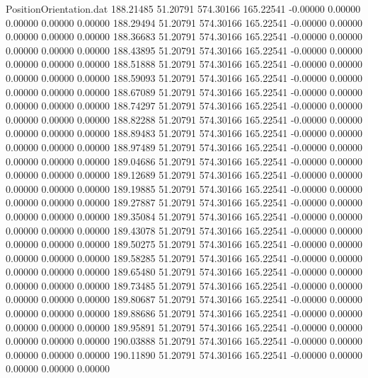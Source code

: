 \begin{filecontents}{PositionOrientation.dat}
 188.21485   51.20791  574.30166   165.22541   -0.00000    0.00000    0.00000    0.00000    0.00000
 188.29494   51.20791  574.30166   165.22541   -0.00000    0.00000    0.00000    0.00000    0.00000
 188.36683   51.20791  574.30166   165.22541   -0.00000    0.00000    0.00000    0.00000    0.00000
 188.43895   51.20791  574.30166   165.22541   -0.00000    0.00000    0.00000    0.00000    0.00000
 188.51888   51.20791  574.30166   165.22541   -0.00000    0.00000    0.00000    0.00000    0.00000
 188.59093   51.20791  574.30166   165.22541   -0.00000    0.00000    0.00000    0.00000    0.00000
 188.67089   51.20791  574.30166   165.22541   -0.00000    0.00000    0.00000    0.00000    0.00000
 188.74297   51.20791  574.30166   165.22541   -0.00000    0.00000    0.00000    0.00000    0.00000
 188.82288   51.20791  574.30166   165.22541   -0.00000    0.00000    0.00000    0.00000    0.00000
 188.89483   51.20791  574.30166   165.22541   -0.00000    0.00000    0.00000    0.00000    0.00000
 188.97489   51.20791  574.30166   165.22541   -0.00000    0.00000    0.00000    0.00000    0.00000
 189.04686   51.20791  574.30166   165.22541   -0.00000    0.00000    0.00000    0.00000    0.00000
 189.12689   51.20791  574.30166   165.22541   -0.00000    0.00000    0.00000    0.00000    0.00000
 189.19885   51.20791  574.30166   165.22541   -0.00000    0.00000    0.00000    0.00000    0.00000
 189.27887   51.20791  574.30166   165.22541   -0.00000    0.00000    0.00000    0.00000    0.00000
 189.35084   51.20791  574.30166   165.22541   -0.00000    0.00000    0.00000    0.00000    0.00000
 189.43078   51.20791  574.30166   165.22541   -0.00000    0.00000    0.00000    0.00000    0.00000
 189.50275   51.20791  574.30166   165.22541   -0.00000    0.00000    0.00000    0.00000    0.00000
 189.58285   51.20791  574.30166   165.22541   -0.00000    0.00000    0.00000    0.00000    0.00000
 189.65480   51.20791  574.30166   165.22541   -0.00000    0.00000    0.00000    0.00000    0.00000
 189.73485   51.20791  574.30166   165.22541   -0.00000    0.00000    0.00000    0.00000    0.00000
 189.80687   51.20791  574.30166   165.22541   -0.00000    0.00000    0.00000    0.00000    0.00000
 189.88686   51.20791  574.30166   165.22541   -0.00000    0.00000    0.00000    0.00000    0.00000
 189.95891   51.20791  574.30166   165.22541   -0.00000    0.00000    0.00000    0.00000    0.00000
 190.03888   51.20791  574.30166   165.22541   -0.00000    0.00000    0.00000    0.00000    0.00000
 190.11890   51.20791  574.30166   165.22541   -0.00000    0.00000    0.00000    0.00000    0.00000

\end{filecontents}
